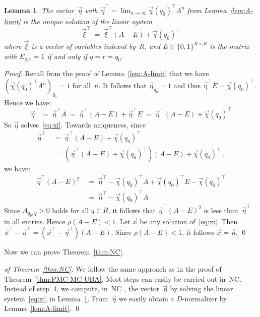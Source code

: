 \documentclass{elsarticle}
\newtheorem{lemma}[definition]{Lemma}
\begin{document}
\begin{lemma} \label{lem:xi}
The vector~$\vec{\eta}$ with $\vec{\eta}^\top = \lim_{n \to \infty} \vec{\chi}(q_0)^\top A^n$ from Lemma~\ref{lem:A-limit} is the unique solution of the linear system
\begin{equation} \label{eq:xi}
\vec{\xi}^\top \ = \ \vec{\xi}^\top (A - E) + \vec{\chi}(q_0)^\top
\end{equation}
where $\vec{\xi}$ is a vector of variables indexed by~$R$, and $E \in \{0,1\}^{R \times R}$ is the matrix with $E_{q,r} = 1$ if and only if $q=r=q_0$.
\end{lemma}
\begin{proof}
Recall from the proof of Lemma~\ref{lem:A-limit} that we have $\left(\vec{\chi}(q_0)^\top A^n\right)_{q_0} = 1$ for all~$n$.
It follows that $\vec{\eta}_{q_0} = 1$ and thus $\vec{\eta}^\top E = \vec{\chi}(q_0)^\top$.
Hence we have:
\[
\vec{\eta}^\top\ = \ \vec{\eta}^\top A  \ = \ \vec{\eta}^\top (A - E) + \vec{\eta}^\top E \ = \ \vec{\eta}^\top (A - E) + \vec{\chi}(q_0)^\top
\]
So $\vec{\eta}$ solves~\eqref{eq:xi}.
Towards uniqueness, since
\begin{align*}
\vec{\eta}^\top
& \ = \ \vec{\eta}^\top (A - E) + \vec{\chi}(q_0)^\top \\
& \ = \ \left( \vec{\eta}^\top (A-E) + \vec{\chi}(q_0)^\top \right) (A - E) + \vec{\chi}(q_0)^\top\,,
\end{align*}
we have:
\begin{align*}
\vec{\eta}^\top (A-E)^2
& \ = \ \vec{\eta}^\top - \vec{\chi}(q_0)^\top A  + \vec{\chi}(q_0)^\top E - \vec{\chi}(q_0)^\top \\
& \ = \ \vec{\eta}^\top - \vec{\chi}(q_0)^\top A
\end{align*}
Since $A_{q_0,q} > 0$ holds for all $q \in R$, it follows that $\vec{\eta}^\top (A-E)^2$ is less than~$\vec{\eta}^\top$ in all entries.
Hence $\rho(A-E) < 1$.
Let $\vec{x}$ be any solution of~\eqref{eq:xi}.
Then $\vec{x}^\top - \vec{\eta}^\top = \left(\vec{x}^\top - \vec{\eta}^\top\right) (A-E)$.
Since $\rho(A-E) < 1$, it follows $\vec{x} = \vec{\eta}$.
\qed
\end{proof}

Now we can prove Theorem~\ref{thm:NC}.
\begin{proof}[of Theorem~\ref{thm:NC}]
We follow the same approach as in the proof of Theorem~\ref{thm:PMC-MC-UBA}.
Most steps can easily be carried out in~NC.
Instead of step~4, we compute, in~NC \cite[Theorem~5]{BorodinGathenHopcroft82}, the vector~$\vec{\eta}$ by solving the linear system~\eqref{eq:xi} in Lemma~\ref{lem:xi}.
From~$\vec{\eta}$ we easily obtain a $D$-normalizer by Lemma~\ref{lem:A-limit}.
\qed
\end{proof}
\end{document}
